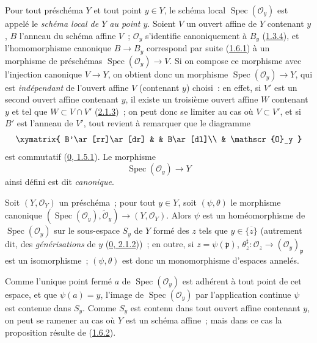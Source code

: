 Pour tout préschéma $Y$ et tout point $y\in Y$, le schéma local
$\operatorname{Spec}(\mathscr{O}_y)$ est appelé le \emph{schéma local de $Y$
au point $y$}. Soient $V$ un ouvert affine de $Y$ contenant $y$, $B$ l'anneau
du schéma affine $V$~; $\mathscr{O}_y$ s'identifie canoniquement à $B_y$
(\hyperref[I.1.3.4-fr]{1.3.4}), et l'homomorphisme canonique $B\to B_y$
correspond par suite (\hyperref[I.1.6.1-fr]{1.6.1}) à un morphisme de
préschémas $\operatorname{Spec}(\mathscr{O}_y)\to V$. Si on compose ce
morphisme avec l'injection canonique $V\to Y$, on obtient donc un morphisme
$\operatorname{Spec}(\mathscr{O}_y)\to Y$, qui est \emph{indépendant} de
l'ouvert affine $V$ (contenant $y$) choisi~: en effet, si $V'$ est un second
ouvert affine contenant $y$, il existe un troisième ouvert affine $W$
contenant $y$ et tel que $W\subset V\cap V'$
(\hyperref[I.2.1.3-fr]{2.1.3})~; on peut donc se limiter au cas où
$V\subset V'$, et si $B'$ est l'anneau de $V'$, tout revient à remarquer que
le diagramme
\label{I.2.4.1.diagram-fr}
\[
  \xymatrix{
    B'\ar[rr]\ar[dr] & & B\ar[dl]\\
    & \mathscr{O}_y
  }
\]
est commutatif (\hyperref[0.1.5.1-fr]{0, 1.5.1}). Le morphisme
\[
  \operatorname{Spec}(\mathscr{O}_y)\to Y
\]
ainsi défini est dit \emph{canonique}.

\begin{proposition}[2.4.2]
\label{I.2.4.2-fr}
Soit $(Y,\mathscr{O}_Y)$ un préschéma~; pour tout $y\in Y$, soit
$(\psi,\theta)$ le morphisme canonique
$(\operatorname{Spec}(\mathscr{O}_y),\widetilde{\mathscr{O}}_y)
\to(Y,\mathscr{O}_Y)$. Alors $\psi$ est un homéomorphisme de
$\operatorname{Spec}(\mathscr{O}_y)$ sur le sous-espace $S_y$ de $Y$ formé
des $z$ tels que $y\in\overline{\{z\}}$ (autrement dit, des
\emph{générisations} de $y$ (\hyperref[0.2.1.2-fr]{0, 2.1.2}))~; en outre,
si $z=\psi(\mathfrak{p})$,
$\theta_z^{\sharp}:\mathscr{O}_z\to(\mathscr{O}_y)_{\mathfrak{p}}$ est un
isomorphisme~; $(\psi,\theta)$ est donc un monomorphisme d'espaces annelés.
\end{proposition}

Comme l'unique point fermé $a$ de $\operatorname{Spec}(\mathscr{O}_y)$ est
adhérent à tout point de cet espace, et que $\psi(a)=y$, l'image de
$\operatorname{Spec}(\mathscr{O}_y)$ par l'application continue $\psi$ est
contenue dans $S_y$. Comme $S_y$ est contenu dans tout ouvert affine
contenant $y$, on peut se ramener au cas où $Y$ est un schéma affine~; mais
dans ce cas la proposition résulte de
(\hyperref[I.1.6.2-fr]{1.6.2}).

